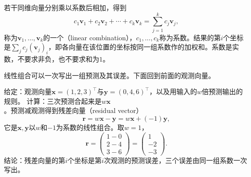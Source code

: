 若干同维向量分别乘以系数后相加，得到
\[
 c_1\bm v_1+c_2\bm v_2+\cdots+c_k\bm v_k=\sum_{j=1}^k c_j\bm v_j,
\]
称为$\bm v_1,\ldots,\bm v_k$的一个（linear combination），$c_1,\ldots,c_k$称为系数。结果的第$i$个坐标是$\sum_jc_j(\bm v_j)_i$，即各向量在该位置的坐标按同一组系数作的加权和。系数是实数，不要求非负，也不要求和为$1$。

线性组合可以一次写出一组预测及其误差。下面回到前面的观测向量。
\begin{example}[残差向量是线性组合]
\label{ex:ls-residual-vector}
给定：观测向量$\bm x=(1,2,3)^\top$与$\bm y=(0,4,6)^\top$，以及用输入的$w$倍预测输出的规则。
计算：三次预测合起来是$w\bm x$。预测减观测得到残差向量（residual vector）
\[
 \bm r=w\bm x-\bm y=w\bm x+(-1)\bm y,
\]
它是$\bm x,\bm y$以$w$和$-1$为系数的线性组合。取$w=1$，
\[
 \bm r=\begin{pmatrix}1-0\\2-4\\3-6\end{pmatrix}=\begin{pmatrix}1\\-2\\-3\end{pmatrix}.
\]
结论：残差向量的第$i$个坐标是第$i$次观测的预测误差，三个误差由同一组系数一次写出。
\end{example}

